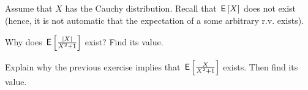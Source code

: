 \documentclass[assignments]{subfiles}
\begin{document}
Assume that $X$ has the Cauchy distribution.
Recall that $\,\mathsf{E}\left[X\right]$ does not exist (hence, it is not automatic that the expectation of a some arbitrary r.v.
exists).
\begin{exercise}
Why does $\,\mathsf{E}\left[\frac{|X|}{X^2+1}\right]$ exist? Find its value.
\begin{solution}
\end{solution}
\end{exercise}


\begin{exercise}
Explain why the previous exercise implies that $\,\mathsf{E}\left[\frac{X}{X^2+1}\right]$ exists. Then find its value.
\begin{solution}
\end{solution}
\end{exercise}
\end{document}
